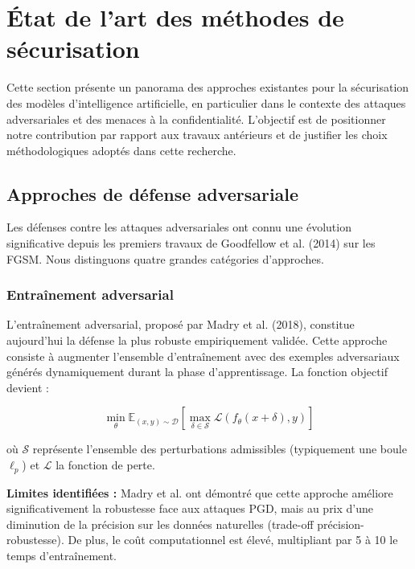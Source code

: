 \section{État de l'art des méthodes de sécurisation}
\label{sec:etat-art}

Cette section présente un panorama des approches existantes pour la sécurisation des modèles d'intelligence artificielle, en particulier dans le contexte des attaques adversariales et des menaces à la confidentialité. L'objectif est de positionner notre contribution par rapport aux travaux antérieurs et de justifier les choix méthodologiques adoptés dans cette recherche.

\subsection{Approches de défense adversariale}
\label{subsec:defenses-adversariales}

Les défenses contre les attaques adversariales ont connu une évolution significative depuis les premiers travaux de Goodfellow et al. (2014) sur les FGSM. Nous distinguons quatre grandes catégories d'approches.

\subsubsection{Entraînement adversarial}

L'entraînement adversarial, proposé par Madry et al. (2018), constitue aujourd'hui la défense la plus robuste empiriquement validée. Cette approche consiste à augmenter l'ensemble d'entraînement avec des exemples adversariaux générés dynamiquement durant la phase d'apprentissage. La fonction objectif devient :

\begin{equation}
\min_{\theta} \mathbb{E}_{(x,y) \sim \mathcal{D}} \left[ \max_{\delta \in \mathcal{S}} \mathcal{L}(f_\theta(x + \delta), y) \right]
\end{equation}

où $\mathcal{S}$ représente l'ensemble des perturbations admissibles (typiquement une boule $\ell_p$) et $\mathcal{L}$ la fonction de perte.

\textbf{Limites identifiées :} Madry et al. ont démontré que cette approche améliore significativement la robustesse face aux attaques PGD, mais au prix d'une diminution de la précision sur les données naturelles (trade-off précision-robustesse). De plus, le coût computationnel est élevé, multipliant par 5 à 10 le temps d'entraînement.


